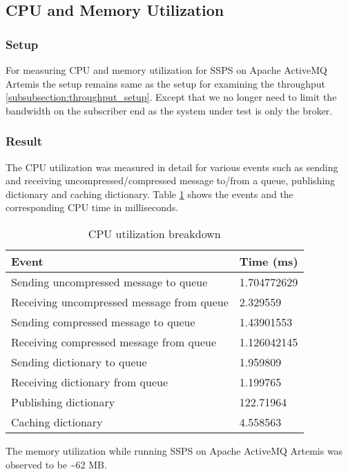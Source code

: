\subsection{CPU and Memory Utilization} \label{cpu}

\subsubsection{Setup}

For measuring CPU and memory utilization for SSPS on Apache ActiveMQ Artemis the setup remains same as the setup for examining the throughput \ref{subsubsection:throughput_setup}. Except that we no longer need to limit the bandwidth on the subscriber end as the system under test is only the broker.

\subsubsection{Result}

The CPU utilization was measured in detail for various events such as sending and receiving uncompressed/compressed message to/from a queue, publishing dictionary and caching dictionary. Table \ref{table:cpu_utilization} shows the events and the corresponding CPU time in milliseconds.

\begin{table}[h!]
\centering
\caption{CPU utilization breakdown}
\label{table:cpu_utilization}
\begin{tabular}{ll}
    \toprule
    Event & Time (ms) \\
\midrule
    Sending uncompressed message to queue & 1.704772629 \\
    Receiving uncompressed message from queue & 2.329559 \\
    Sending compressed message to queue & 1.43901553 \\
    Receiving compressed message from queue    & 1.126042145 \\
    Sending dictionary to queue & 1.959809 \\
    Receiving dictionary from queue & 1.199765 \\
    Publishing dictionary & 122.71964 \\
    Caching dictionary & 4.558563 \\
\bottomrule
\end{tabular}
\end{table} 

The memory utilization while running SSPS on Apache ActiveMQ Artemis was observed to be \textasciitilde62 MB.

